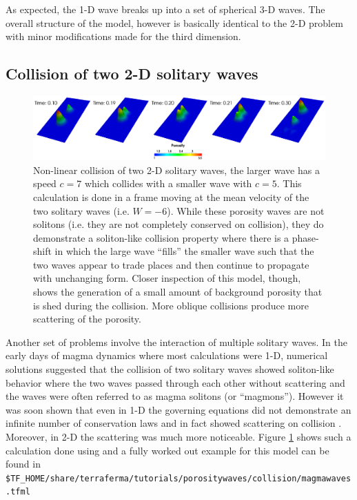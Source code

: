 As expected,  the 1-D wave breaks up into a set of spherical 3-D
waves.  The overall structure of the model, however is basically
identical to the 2-D problem with minor modifications made for the third dimension. 

\subsection{Collision of two 2-D solitary waves}
\label{sec:collision-two-2}

\begin{figure}[htbp!]
  \centering
  \includegraphics[width=\textwidth]{figures/collision.pdf}
  \caption{Non-linear collision of two 2-D solitary waves, the larger
    wave has a speed $c=7$ which collides with a smaller wave with
    $c=5$. This calculation is done in a frame moving at the mean
    velocity of the two solitary waves (i.e. $W=-6$).  While these
    porosity waves are not solitons (i.e. they are not completely
    conserved on collision), they do demonstrate a soliton-like
    collision property where there is a phase-shift in which  the large
    wave ``fills'' the smaller wave such that the two waves appear to
    trade places and then continue to propagate with unchanging form.
  Closer inspection of this model, though, shows the generation of a
  small amount of background porosity that is shed during the
  collision.  More oblique collisions produce more scattering of the
  porosity.  }
  \label{fig:collision}
\end{figure}

Another set of problems involve the interaction of multiple solitary
waves.  In the early days of magma dynamics where most calculations
were 1-D,  numerical solutions suggested that the collision of two
solitary waves showed soliton-like behavior where the two waves passed
through each other without scattering and the waves were often
referred to as magma solitons (or ``magmons'').  However it was soon
shown that even in 1-D the governing equations did not demonstrate an
infinite number of conservation laws and in fact showed scattering on
collision
\cite{barcilon_nonlinear-waves_1986,barcilon_solitary_1989}. Moreover,
in 2-D the scattering was much more noticeable. Figure
\ref{fig:collision} shows such a calculation done using \TF{} and a
fully worked out example for this model can be found in
\texttt{\$TF\_HOME/share/terraferma/tutorials/porositywaves/collision/magmawaves.tfml} 

